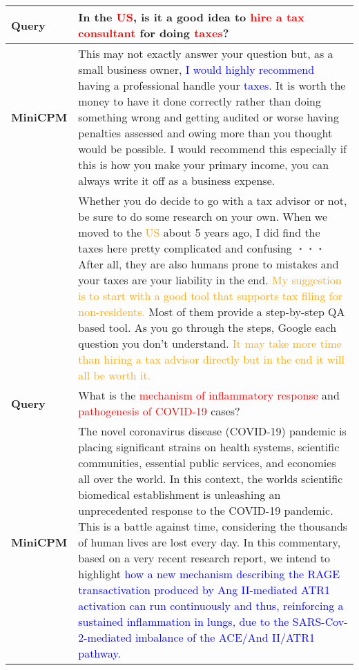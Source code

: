 \begin{table*}[t]
\centering
\small
\begin{tabular}{lp{12.5cm}} %
\hline
\textbf{Query} & In the \textcolor{red}{US}, is it a good idea to \textcolor{red}{hire a tax consultant} for doing \textcolor{red}{taxes}? \\
\hline
\textbf{MiniCPM} & This may not exactly answer your question but, as a small business owner, \textcolor{blue}{I would highly recommend} having a professional handle your \textcolor{blue}{taxes}. It is worth the money to have it done correctly rather than doing something wrong and getting audited or worse having penalties assessed and owing more than you thought would be possible. I would recommend this especially if this is how you make your primary income, you can always write it off as a business expense.\\
\hline
\textbf{\method{}} & Whether you do decide to go with a tax advisor or not, be sure to do some research on your own. When we moved to the \textcolor{orange}{US} about 5 years ago, I did find the taxes here pretty complicated and confusing \textbf{···} After all, they are also humans prone to mistakes and your taxes are your liability in the end.  \textcolor{orange}{My suggestion is to start with a good tool that supports tax filing for non-residents.} Most of them provide a step-by-step QA based tool. As you go through the steps, Google each question you don't understand. \textcolor{orange}{It may take more time than hiring a tax advisor directly but in the end it will all be worth it.} \\
\hline
\textbf{Query} &What is the \textcolor{red}{mechanism of inflammatory response} and \textcolor{red}{pathogenesis of COVID-19} cases?\\
\hline
\textbf{MiniCPM}&The novel coronavirus disease (COVID-19) pandemic is placing significant strains on health systems, scientific communities, essential public services, and economies all over the world. In this context, the worlds scientific biomedical establishment is unleashing an unprecedented response to the COVID-19 pandemic. This is a battle against time, considering the thousands of human lives are lost every day. In this commentary, based on a very recent research report, we intend to highlight \textcolor{blue}{how a new mechanism describing the RAGE transactivation produced by Ang II-mediated ATR1 activation can run continuously and thus, reinforcing a sustained inflammation in lungs, due to the SARS-Cov-2-mediated imbalance of the ACE/And II/ATR1 pathway.}\\

\end{tabular}
\end{table*}
